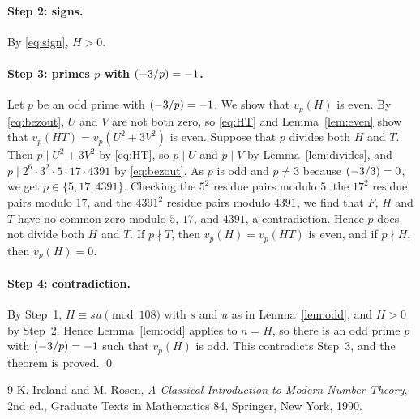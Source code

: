 \documentclass[11pt]{article}
\newcommand{\leg}[2]{\mathchoice{\biggl(\dfrac{#1}{#2}\biggr)}{(#1/#2)}{(#1/#2)}{(#1/#2)}}
\begin{document}
\paragraph{Step 2: signs.} By \eqref{eq:sign}, $H>0$.

\paragraph{\texorpdfstring{Step 3: primes $p$ with $\leg{-3}{p}=-1$.}{Step 3: inert primes.}} Let $p$ be an odd prime with $\leg{-3}{p}=-1$. We show that $v_p(H)$ is even. By \eqref{eq:bezout}, $U$ and $V$ are not both zero, so \eqref{eq:HT} and Lemma~\ref{lem:even} show that $v_p(HT)=v_p(U^2+3V^2)$ is even. Suppose that $p$ divides both $H$ and $T$. Then $p\mid U^2+3V^2$ by \eqref{eq:HT}, so $p\mid U$ and $p\mid V$ by Lemma~\ref{lem:divides}, and $p\mid 2^{6}\cdot 3^{2}\cdot 5\cdot 17\cdot 4391$ by \eqref{eq:bezout}. As $p$ is odd and $p\neq3$ because $\leg{-3}{3}=0$, we get $p\in\{5,17,4391\}$. Checking the $5^2$ residue pairs modulo $5$, the $17^2$ residue pairs modulo $17$, and the $4391^2$ residue pairs modulo $4391$, we find that $F$, $H$ and $T$ have no common zero modulo $5$, $17$, and $4391$, a contradiction. Hence $p$ does not divide both $H$ and $T$. If $p\nmid T$, then $v_p(H)=v_p(HT)$ is even, and if $p\nmid H$, then $v_p(H)=0$.

\paragraph{Step 4: contradiction.} By Step~1, $H\equiv su\pmod{108}$ with $s$ and $u$ as in Lemma~\ref{lem:odd}, and $H>0$ by Step~2. Hence Lemma~\ref{lem:odd} applies to $n=H$, so there is an odd prime $p$ with $\leg{-3}{p}=-1$ such that $v_p(H)$ is odd. This contradicts Step~3, and the theorem is proved.
\qed

\begin{thebibliography}{9}
 K. Ireland and M. Rosen, \emph{A Classical Introduction to Modern Number Theory}, 2nd ed., Graduate Texts in Mathematics 84, Springer, New York, 1990.
\end{thebibliography}
\end{document}
